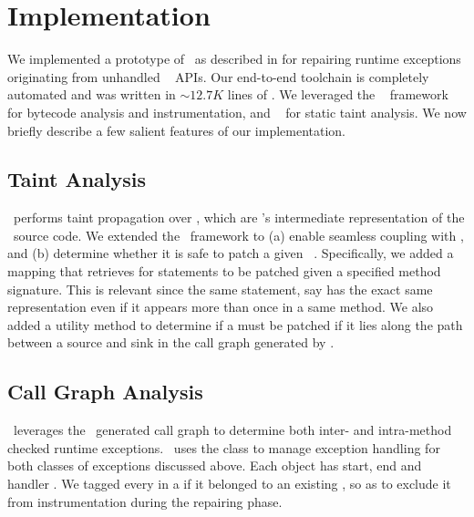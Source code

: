 \section{Implementation}
\label{sec:implementation}

We implemented a prototype of \tool\ as described in  for
repairing runtime exceptions originating from unhandled \java\ 
APIs. Our end-to-end toolchain is completely automated and was written in
$\sim$$12.7K$ lines of \java. We leveraged the \soot~\cite{soot} framework for
bytecode analysis and instrumentation, and \infoflow~\cite{infoflow} for static
taint analysis. We now briefly describe a few salient features of our
implementation.

\subsection{Taint Analysis}

\infoflow\ performs taint propagation over , which are \soot's
intermediate representation of the \java\ source code. We extended the
\infoflow\ framework to (a) enable seamless coupling with \soot, and (b)
determine whether it is safe to patch a given \soot\ . Specifically,
we added a mapping that retrieves  for statements to be patched
given a specified method signature. This is relevant since the same statement,
say  has the exact same representation even if it appears more
than once in a same method. We also added a utility method to determine if a
 must be patched if it lies along the path between a source and sink 
in the call graph generated by \soot.

\subsection{Call Graph Analysis}
\label{subsec:callChainLookUp}

\tool\ leverages the \soot\ generated call graph to determine both inter- and
intra-method checked runtime exceptions. \soot\ uses the  class to
manage exception handling for both classes of exceptions discussed above. Each
 object has start, end and handler . We tagged every
 in a  if it belonged to an existing , so as
to exclude it from instrumentation during the repairing phase.
% 

